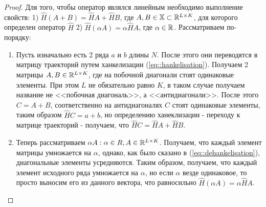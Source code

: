 \begin{proof}
	Для того, чтобы оператор являлся линейным необходимо выполнение свойств: 1) $\hat{H}(A + B) = \hat{H}A + \hat{H}B$, где $A, B \in \mathbb{X} \subset \mathbb{R}^{L \times K}$, для которого определен оператор $\hat{H}$ 2) $\hat{H}(\alpha A) = \alpha \hat{H}A$, где $\alpha \in \mathbb{R}$. Рассматриваем по-порядку:
	\begin{enumerate}
		\item Пусть изначально есть 2 ряда $a$ и $b$ длины $N$. После этого они переводятся в матрицу траекторий путем ханкелизации (\ref{eq::hankelisation}). Получаем 2 матрицы $A, B \in \mathbb{R}^{L \times K}$, где на побочной диагонали стоят одинаковые элементы. При этом $L$ не обязательно равно $K$, в таком случае получаем название не <<побочная диагональ>>, а <<антидиагонали>>. После этого $C = A + B$, соответственно на антидиагоналях $C$ стоят одинаковые элементы, таким образом $\hat{H}C = a + b$, но определению ханеклизации - переходу к матрице траекторий - получаем, что $\hat{H}C = \hat{H}A + \hat{H}B$.
		\item Теперь рассматриваем $\alpha A: \alpha \in R, A \in \mathbb{R}^{L \times K}$. Получаем, что каждый элемент матрицы умножается на $\alpha$, однако, как было сказано в (\ref{eq::dehankelisation}), диагональные элементы усредняются. Таким образом, получаем, что каждый элемент исходного ряда умножается на $\alpha$, но если $\alpha$ везде одинаковое, то просто выносим его из данного вектора, что равносильно $\hat{H}(\alpha A) = \alpha \hat{H}A$.
	\end{enumerate}
\end{proof}

